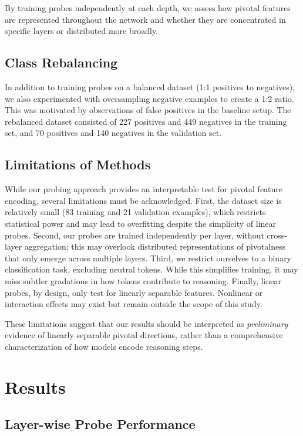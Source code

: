 \documentclass{article}
\begin{document}
By training probes independently at each depth, we assess how pivotal features are represented throughout the network and whether they are concentrated in specific layers or distributed more broadly.


\subsection{Class Rebalancing}
In addition to training probes on a balanced dataset (1:1 positives to negatives), we also experimented with oversampling negative examples to create a 1:2 ratio. This was motivated by observations of false positives in the baseline setup. The rebalanced dataset consisted of 227 positives and 449 negatives in the training set, and 70 positives and 140 negatives in the validation set.


\subsection{Limitations of Methods}
While our probing approach provides an interpretable test for pivotal feature encoding, several limitations must be acknowledged. First, the dataset size is relatively small (83 training and 21 validation examples), which restricts statistical power and may lead to overfitting despite the simplicity of linear probes. Second, our probes are trained independently per layer, without cross-layer aggregation; this may overlook distributed representations of pivotalness that only emerge across multiple layers. Third, we restrict ourselves to a binary classification task, excluding neutral tokens. While this simplifies training, it may miss subtler gradations in how tokens contribute to reasoning. Finally, linear probes, by design, only test for linearly separable features. Nonlinear or interaction effects may exist but remain outside the scope of this study. 

These limitations suggest that our results should be interpreted as \textit{preliminary} evidence of linearly separable pivotal directions, rather than a comprehensive characterization of how models encode reasoning steps.


\section{Results}

\subsection{Layer-wise Probe Performance}
\end{document}
